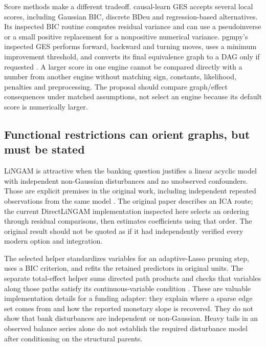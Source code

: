 Score methods make a different tradeoff. causal-learn GES accepts several
local scores, including Gaussian BIC, discrete BDeu and regression-based
alternatives. Its inspected BIC routine computes residual variance and can use
a pseudoinverse or a small positive replacement for a nonpositive numerical
variance. pgmpy's inspected GES performs forward, backward and turning moves,
uses a minimum improvement threshold, and converts its final equivalence graph
to a DAG only if requested
\citep{exec13_pydisc_causallearn,exec13_pydisc_pgmpy}. A larger score in one
engine cannot be compared directly with a number from another engine without
matching sign, constants, likelihood, penalties and preprocessing. The
proposal should compare graph/effect consequences under matched assumptions,
not select an engine because its default score is numerically larger.

\subsection{Functional restrictions can orient graphs, but must be stated}

LiNGAM is attractive when the banking question justifies a linear acyclic model
with independent non-Gaussian disturbances and no unobserved confounders. Those
are explicit premises in the original work, including independent repeated
observations from the same model \citep{exec13_pydisc_shimizu2006}. The original
paper describes an ICA route; the current DirectLiNGAM implementation inspected
here selects an ordering through residual comparisons, then estimates
coefficients using that order. The original result should not be quoted as
if it had independently verified every modern option and integration.

The selected helper standardizes variables for an adaptive-Lasso pruning step,
uses a BIC criterion, and refits the retained predictors in original units.
The separate total-effect helper sums directed path products and checks that
variables along those paths satisfy its continuous-variable condition
\citep{exec13_pydisc_lingam}. These are valuable implementation details for a
funding adapter: they explain where a sparse edge set comes from and how the
reported monetary slope is recovered. They do not show that bank disturbances
are independent or non-Gaussian. Heavy tails in an observed balance series
alone do not establish the required disturbance model after conditioning on
the structural parents.

